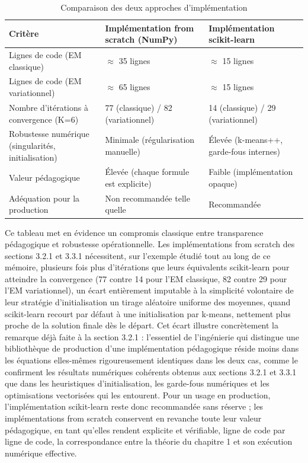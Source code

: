 \begin{table}[H]
\centering
\small
\setlength{\tabcolsep}{0.14cm}
\begin{tabular}{|p{4.84cm}|p{4.84cm}|p{4.84cm}|}
\hline
\textbf{Critère} & \textbf{Implémentation from scratch (NumPy)} & \textbf{Implémentation scikit-learn} \\
\hline
Lignes de code (EM classique) & $\approx $ 35 lignes & $\approx $ 15 lignes \\
\hline
Lignes de code (EM variationnel) & $\approx $ 65 lignes & $\approx $ 15 lignes \\
\hline
Nombre d'itérations à convergence (K=6) & 77 (classique) / 82 (variationnel) & 14 (classique) / 29 (variationnel) \\
\hline
Robustesse numérique (singularités, initialisation) & Minimale (régularisation manuelle) & Élevée (k-means++, garde-fous internes) \\
\hline
Valeur pédagogique & Élevée (chaque formule est explicite) & Faible (implémentation opaque) \\
\hline
Adéquation pour la production & Non recommandée telle quelle & Recommandée \\
\hline
\end{tabular}
\caption{Comparaison des deux approches d'implémentation}
\label{tab:3_2}
\end{table}
Ce tableau met en évidence un compromis classique entre transparence pédagogique et robustesse opérationnelle. Les implémentations from scratch des sections 3.2.1 et 3.3.1 nécessitent, sur l'exemple étudié tout au long de ce mémoire, plusieurs fois plus d'itérations que leurs équivalents scikit-learn pour atteindre la convergence (77 contre 14 pour l'EM classique, 82 contre 29 pour l'EM variationnel), un écart entièrement imputable à la simplicité volontaire de leur stratégie d'initialisation  un tirage aléatoire uniforme des moyennes, quand scikit-learn recourt par défaut à une initialisation par k-means, nettement plus proche de la solution finale dès le départ. Cet écart illustre concrètement la remarque déjà faite à la section 3.2.1 : l'essentiel de l'ingénierie qui distingue une bibliothèque de production d'une implémentation pédagogique réside moins dans les équations elles-mêmes  rigoureusement identiques dans les deux cas, comme le confirment les résultats numériques cohérents obtenus aux sections 3.2.1 et 3.3.1  que dans les heuristiques d'initialisation, les garde-fous numériques et les optimisations vectorisées qui les entourent. Pour un usage en production, l'implémentation scikit-learn reste donc recommandée sans réserve ; les implémentations from scratch conservent en revanche toute leur valeur pédagogique, en tant qu'elles rendent explicite et vérifiable, ligne de code par ligne de code, la correspondance entre la théorie du chapitre 1 et son exécution numérique effective.

